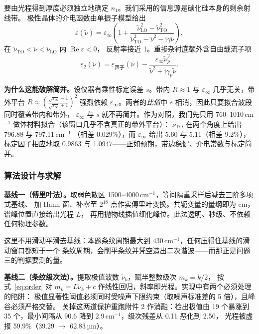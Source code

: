 \documentclass[12pt]{article}
\begin{document}
要由光程得到厚度必须独立地确定 $n_1$。我们采用的信息源是碳化硅本身的剩余射线带。
极性晶体的介电函数由单振子模型给出
\begin{equation}
  \varepsilon(\tilde\nu)=\varepsilon_\infty\left(1+
  \frac{\tilde\nu_{\mathrm{LO}}^{2}-\tilde\nu_{\mathrm{TO}}^{2}}
       {\tilde\nu_{\mathrm{TO}}^{2}-\tilde\nu^{2}-\mathrm{i}\gamma\tilde\nu}\right),
  \label{eq:lorentz}
\end{equation}
在 $\tilde\nu_{\mathrm{TO}}<\tilde\nu<\tilde\nu_{\mathrm{LO}}$ 内 $\operatorname{Re}\varepsilon<0$，
反射率接近 1。重掺杂衬底额外含自由载流子项
\begin{equation}
  \varepsilon_2(\tilde\nu)=\varepsilon_{\text{声子}}(\tilde\nu)
  -\frac{\varepsilon_\infty\tilde\nu_p^{2}}{\tilde\nu^{2}+\mathrm{i}\gamma_p\tilde\nu} .
\end{equation}

\textbf{为什么这能破解简并。}\;设仪器有乘性标定误差 $s$。带内 $R\approx1$ 与 $\varepsilon_\infty$
几乎无关，带外平台 $R\approx\left(\frac{\sqrt{\varepsilon_\infty}-1}{\sqrt{\varepsilon_\infty}+1}\right)^2$
强烈依赖 $\varepsilon_\infty$。两者的\emph{比值}中 $s$ 相消，因此只要拟合波段同时覆盖带内和带外，
$\varepsilon_\infty$ 与 $s$ 就不再简并。作为对照，我们先只用 760--1010\,cm$^{-1}$ 做体材料拟合（该窗口几乎不含真正的带外平台）：
$\tilde\nu_{\mathrm{TO}}$ 在两个角度上给出 796.88 与 797.11\,cm$^{-1}$
（相差 0.029\%），而 $\varepsilon_\infty$ 给出 5.60 与
5.11（相差 9.2\%），标定因子相应地取 0.9863 与
1.0947——正如预期，带边稳健、介电常数与标定简并。

\subsubsection{算法设计与求解}

\textbf{基线一（傅里叶法）。}\;取弱色散区 1500--4000\,cm$^{-1}$，等间隔重采样后减去三阶多项式基线、
加 Hann 窗、补零至 $2^{18}$ 点作实傅里叶变换。共轭变量的量纲即为 cm，谱峰位置直接给出光程 $L$，
再用抛物线插值细化峰位。此法透明、秒级、不依赖任何物理参数。

这里不用滑动平滑去基线：本题条纹周期最大到 430\,cm$^{-1}$，任何压得住基线的滑动窗口都短于一个
条纹周期，会削平条纹并凭空造出二次谐波——而那正是问题三的判据要测的量。

\textbf{基线二（条纹级次法）。}\;提取极值波数 $\tilde\nu_k$，赋半整数级次 $m_k=k/2$，
按式~\eqref{eq:order} 对 $m_k=L\tilde\nu_k+c$ 作线性回归，斜率即光程。实现中有两个必须处理的陷阱：
极值显著性阈值必须同时受噪声下限约束（取噪声标准差的 5 倍），且峰谷必须严格交替。
关掉这两道保护重跑附件 2 作消融：检出极值由 19 个暴涨到
35 个，最小间隔从 90.6
降到 2.9\,cm$^{-1}$，级次残差从
0.11 恶化到 2.50，
光程被虚报 59.9\%（39.29
$\rightarrow$ 62.83\,µm）。
\end{document}
